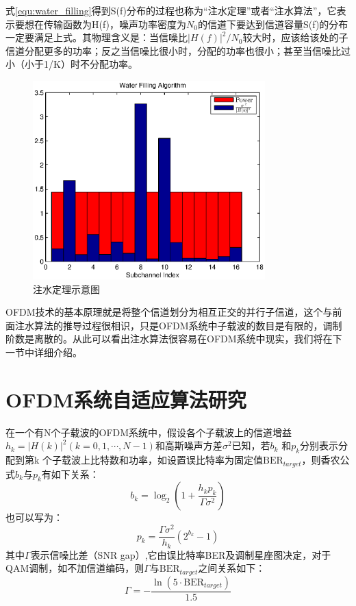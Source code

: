式\ref{equ:water_filling}得到S(f)分布的过程也称为“注水定理”或者“注水算法”，它表示要想在传输函数为H(f)，噪声功率密度为$N_0$的信道下要达到信道容量S(f)的分布一定要满足上式。其物理含义是：当信噪比$|H(f)|^2/N_0$较大时，应该给该处的子信道分配更多的功率；反之当信噪比很小时，分配的功率也很小；甚至当信噪比过小（小于1/K）时不分配功率。
\begin{figure}[htbp]
\centering
\includegraphics[width=0.8\textwidth]{figures/chapter-4/waterFilling.eps}
\caption{注水定理示意图}
\label{fig:waterFilling}
\end{figure}
OFDM技术的基本原理就是将整个信道划分为相互正交的并行子信道，这个与前面注水算法的推导过程很相识，只是OFDM系统中子载波的数目是有限的，调制阶数是离散的。从此可以看出注水算法很容易在OFDM系统中现实，我们将在下一节中详细介绍。
\section{OFDM系统自适应算法研究}
在一个有N个子载波的OFDM系统中，假设各个子载波上的信道增益$h_k=|H(k)|^2(k=0,1,\cdots,N-1)$和高斯噪声方差$\sigma^2$已知，若$b_k$ 和$p_k$分别表示分配到第k 个子载波上比特数和功率，如设置误比特率为固定值$\text{BER}_{target}$，则香农公式$b_k$与$p_k$有如下关系：
\begin{equation}
b_k = \log_2(1+\frac{h_kp_k}{\Gamma\sigma^2})
\end{equation}
也可以写为：
\begin{equation}
p_k = \frac{\Gamma\sigma^2}{h_k}(2^{b_k}-1)
\end{equation}
其中$\Gamma$表示信噪比差（SNR gap）,它由误比特率BER及调制星座图决定，对于QAM调制，如不加信道编码，则$\Gamma$与$\text{BER}_{target}$之间关系如下\cite{余官定2005ofdm}：
\begin{equation}
\Gamma = -\frac{\ln(5\cdot\text{BER}_{target})}{1.5}
\end{equation}

